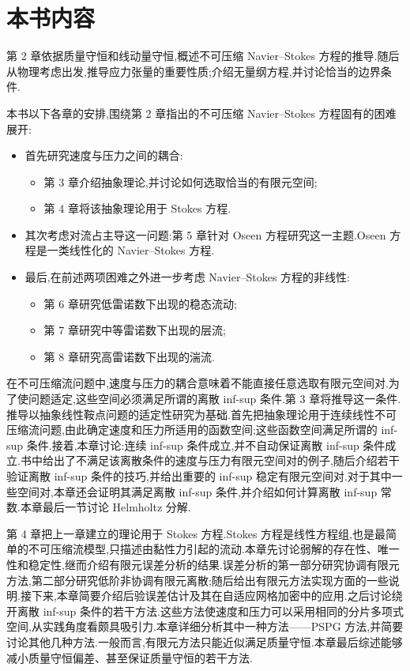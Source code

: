 \section{本书内容}\label{sec:contents-of-monograph}

第 2 章依据质量守恒和线动量守恒,概述不可压缩 Navier--Stokes 方程的推导.随后从物理考虑出发,推导应力张量的重要性质;介绍无量纲方程,并讨论恰当的边界条件.

本书以下各章的安排,围绕第 2 章指出的不可压缩 Navier--Stokes 方程固有的困难展开:
\begin{itemize}
  \item 首先研究速度与压力之间的耦合:
    \begin{itemize}
      \item 第 3 章介绍抽象理论,并讨论如何选取恰当的有限元空间;
      \item 第 4 章将该抽象理论用于 Stokes 方程.
    \end{itemize}
  \item 其次考虑对流占主导这一问题:第 5 章针对 Oseen 方程研究这一主题.Oseen 方程是一类线性化的 Navier--Stokes 方程.
  \item 最后,在前述两项困难之外进一步考虑 Navier--Stokes 方程的非线性:
    \begin{itemize}
      \item 第 6 章研究低雷诺数下出现的稳态流动;
      \item 第 7 章研究中等雷诺数下出现的层流;
      \item 第 8 章研究高雷诺数下出现的湍流.
    \end{itemize}
\end{itemize}

在不可压缩流问题中,速度与压力的耦合意味着不能直接任意选取有限元空间对.为了使问题适定,这些空间必须满足所谓的离散 inf-sup 条件.第 3 章将推导这一条件.推导以抽象线性鞍点问题的适定性研究为基础.首先把抽象理论用于连续线性不可压缩流问题,由此确定速度和压力所适用的函数空间;这些函数空间满足所谓的 inf-sup 条件.接着,本章讨论:连续 inf-sup 条件成立,并不自动保证离散 inf-sup 条件成立.书中给出了不满足该离散条件的速度与压力有限元空间对的例子,随后介绍若干验证离散 inf-sup 条件的技巧,并给出重要的 inf-sup 稳定有限元空间对.对于其中一些空间对,本章还会证明其满足离散 inf-sup 条件,并介绍如何计算离散 inf-sup 常数.本章最后一节讨论 Helmholtz 分解.

第 4 章把上一章建立的理论用于 Stokes 方程.Stokes 方程是线性方程组,也是最简单的不可压缩流模型,只描述由黏性力引起的流动.本章先讨论弱解的存在性、唯一性和稳定性,继而介绍有限元误差分析的结果.误差分析的第一部分研究协调有限元方法,第二部分研究低阶非协调有限元离散;随后给出有限元方法实现方面的一些说明.接下来,本章简要介绍后验误差估计及其在自适应网格加密中的应用.之后讨论绕开离散 inf-sup 条件的若干方法.这些方法使速度和压力可以采用相同的分片多项式空间,从实践角度看颇具吸引力.本章详细分析其中一种方法——PSPG 方法,并简要讨论其他几种方法.一般而言,有限元方法只能近似满足质量守恒.本章最后综述能够减小质量守恒偏差、甚至保证质量守恒的若干方法.

